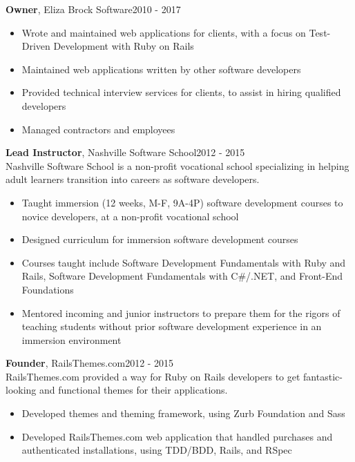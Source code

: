{\bf Owner}, Eliza Brock Software\hfill 2010 - 2017
\begin{itemize} \itemsep -2pt  %
  \item Wrote and maintained web applications for clients, with a focus on Test-Driven \mbox{Development} with Ruby on Rails
  \item Maintained web applications written by other software developers
  \item Provided technical interview services for clients, to assist in hiring qualified developers
  \item Managed contractors and employees
\end{itemize}

{\bf Lead Instructor}, Nashville Software School\hfill 2012 - 2015\\
Nashville Software School is a non-profit vocational school specializing in helping adult learners transition into careers as software developers.
\begin{itemize} \itemsep -2pt  %
  \item Taught immersion (12 weeks, M-F, 9A-4P) software development courses to novice developers, at a non-profit vocational school
  \item Designed curriculum for immersion software development courses
  \item Courses taught include Software Development Fundamentals with Ruby and Rails, Software Development Fundamentals with C\#/.NET, and Front-End Foundations
  \item Mentored incoming and junior instructors to prepare them for the rigors of teaching students without prior software development experience in an immersion environment\end{itemize}

{\bf Founder}, RailsThemes.com\hfill 2012 - 2015\\
RailsThemes.com provided a way for Ruby on Rails developers to get fantastic-looking and functional themes for their applications.
\begin{itemize} \itemsep -2pt  %
    \item Developed themes and theming framework, using Zurb Foundation and Sass
    \item Developed RailsThemes.com web application that handled purchases and authenticated installations, using TDD/BDD, Rails, and RSpec
\end{itemize}

